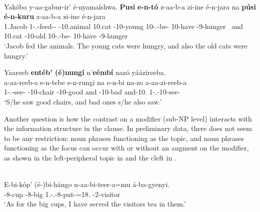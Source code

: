 \documentclass[output=paper]{langscibook}
\begin{document}
\ea
\label{bkm:Ref118715311}
\citep[1332]{AsiimweEtAl2023}\\
\gll
Yakóbo  y-aa-gabur-ir’  é-nyamaíshwa.   \textbf{Pusi}  \textbf{e-n-tó}  z-aa-b-a  zi-ine  é-n-jara na  \textbf{púsi}  \textbf{é-n-kuru}  z-aa-b-a  zi-ine  é-n-jara\\
1.Jacob  1\SM{}-\N{}.\PST{}-feed-\APPL{}-\FV{}  \AUG{}-10.animal 10.cat  \AUG{}-10-young  10\SM{}-\N{}.\PST{}-be-\FV{}  10\SM{}-have  \AUG{}-9-hunger~ and  10.cat  \AUG{}-10-old  10\SM{}-\N{}.\PST{}-be-\FV{}  10\SM{}-have  \AUG{}-9-hunger\\
\glt
‘Jacob fed the animals. The young cats were hungry, and also the old cats were hungry.’
\z

\ea
\label{bkm:Ref118715313}\citep[1332]{AsiimweEtAl2023}
Yaareeb \textbf{entéb’ (é)nungí} n'\textbf{eémbí} nazó yáázíreeba.\\
\gll
a-aa-reeb-a  e-n-tebe  e-n-rungi   na  e-n-bi  na-zo  a-aa-zi-reeb-a  \\
1\SM{}-\N{}.\PST{}-see-\FV{}  \AUG{}-10-chair  \AUG{}-10-good and  \AUG{}-10-bad  and-10.\PRO{}  1\SM{}-\N{}.\PST{}-10\OM{}-see-\FV{} \\
\glt
‘S/he saw good chairs, and bad ones s/he also saw.’\\

\z

Another question is how the contrast on a modifier (sub-NP level) interacts with the information structure in the clause. In preliminary data, there does not seem to be any restriction: noun phrases functioning as the topic, and noun phrases functioning as the focus can occur with or without an augment on the modifier, as shown in the left-peripheral topic in  and the cleft in .


\ea
\label{bkm:Ref118715421}
\citep[1332]{AsiimweEtAl2023}\\
\gll
E-bi-kóp’  (é-)bi-hángo  n-aa-bi-teer-a=mu  á-ba-gyenyi.\\
\AUG{}-8-cup  {\db}\AUG{}-8-big  1\SG{}.\SM{}-\N{}.\PST{}-8\OM{}-put-\FV{}=18.\LOC{}  \AUG{}-2-visitor\\
\glt
‘As for the big cups, I have served the visitors tea in them.’\\
\end{document}

